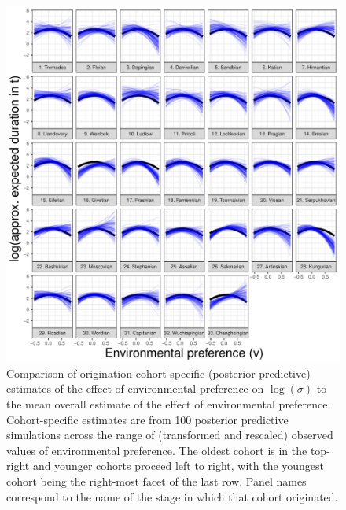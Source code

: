 \documentclass{article}
\begin{document}
\begin{figure}[ht]
  \centering
  \includegraphics[width = \textwidth,height = 0.8\textheight,keepaspectratio=true]{figure/env_cohort_3}
  \caption{Comparison of origination cohort-specific (posterior predictive) estimates of the effect of environmental preference on \(\log(\sigma)\) to the mean overall estimate of the effect of environmental preference. Cohort-specific estimates are from 100 posterior predictive simulations across the range of (transformed and rescaled) observed values of environmental preference. The oldest cohort is in the top-right and younger cohorts proceed left to right, with the youngest cohort being the right-most facet of the last row. Panel names correspond to the name of the stage in which that cohort originated.}
  \label{fig:env_cohort_high}
\end{figure}
\end{document}
